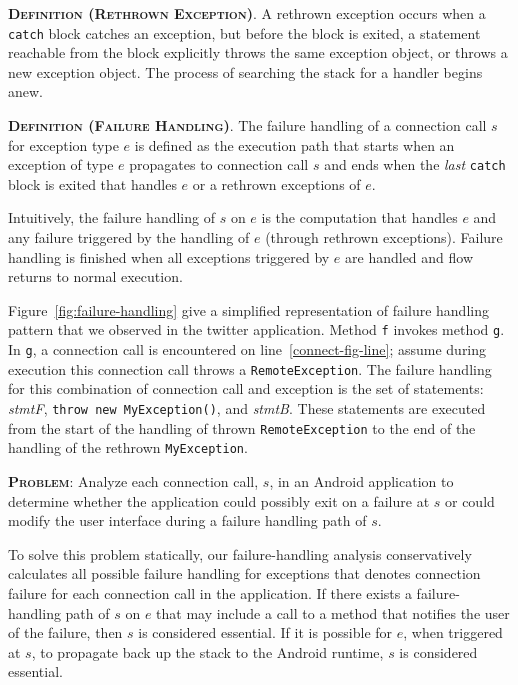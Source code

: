 \begin{description}[leftmargin=0cm,listparindent=0pt,itemindent=0cm]
\item \textsc{\bfseries{Definition (Rethrown Exception)}}.  A
rethrown exception occurs when a \lstinline!catch! block catches an
exception, but before the block is exited, a statement reachable from
the block explicitly throws the same exception object, or throws a new
exception object.  The process of searching the stack for a handler
begins anew.

\item \textsc{\bfseries{Definition (Failure Handling)}}. The failure
  handling of a connection call $s$ for exception type $e$ is defined
  as the execution path that starts when an exception of type $e$
  propagates to connection call $s$ and ends when the {\it last}
  \lstinline!catch! block is exited that handles $e$ or a rethrown
  exceptions of $e$.
\end{description}

Intuitively, the failure handling of $s$ on $e$ is the computation
that handles $e$ and any failure triggered by the handling of $e$
(through rethrown exceptions).  Failure handling is finished when all
exceptions triggered by $e$ are handled and flow returns to normal
execution.  

Figure~\ref{fig:failure-handling} give a simplified representation of 
failure handling pattern that we observed in the twitter application. 
Method \lstinline!f! invokes method
\lstinline!g!.  In \lstinline!g!, a connection call is encountered on
line~\ref{connect-fig-line}; assume during execution this connection call
throws a \lstinline!RemoteException!.  The failure handling for this
combination of connection call and exception is the set of statements:
{\it stmtF}, \lstinline!throw new MyException()!, and {\it stmtB}.
These statements are executed from the start of the handling of thrown
\lstinline!RemoteException! to the end of the handling of the rethrown
\lstinline!MyException!.

\begin{description}[leftmargin=0cm,listparindent=0pt,itemindent=0cm]
\item \textsc{\bfseries{Problem}}: Analyze each connection call,
$s$, in an Android application to determine whether the application
could possibly exit on a failure at $s$ or could modify the user
interface during a failure handling path of $s$.
\end{description}

To solve this problem statically, our failure-handling analysis
conservatively calculates all possible failure handling for exceptions
that denotes connection failure for each connection call in the
application.  If there exists a failure-handling path of $s$ on $e$
that may include a call to a method that notifies the user of the
failure, then $s$ is considered essential.  If it is possible for $e$,
when triggered at $s$, to propagate back up the stack to the Android
runtime, $s$ is considered essential.

